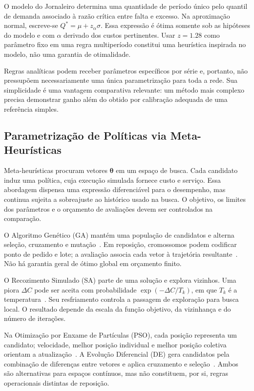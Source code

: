 O modelo do Jornaleiro determina uma quantidade de período único pelo quantil de demanda associado à razão crítica entre falta e excesso. Na aproximação normal, escreve-se $Q^*=\mu+z_\alpha\sigma$. Essa expressão é ótima somente sob as hipóteses do modelo e com $\alpha$ derivado dos custos pertinentes. Usar $z=1.28$ como parâmetro fixo em uma regra multiperíodo constitui uma heurística inspirada no modelo, não uma garantia de otimalidade.

Regras analíticas podem receber parâmetros específicos por série e, portanto, não pressupõem necessariamente uma única parametrização para toda a rede. Sua simplicidade é uma vantagem comparativa relevante: um método mais complexo precisa demonstrar ganho além do obtido por calibração adequada de uma referência simples.

\subsection{Parametrização de Políticas via Meta-Heurísticas}

Meta-heurísticas procuram vetores $\boldsymbol\theta$ em um espaço de busca. Cada candidato induz uma política, cuja execução simulada fornece custo e serviço. Essa abordagem dispensa uma expressão diferenciável para o desempenho, mas continua sujeita a sobreajuste ao histórico usado na busca. O objetivo, os limites dos parâmetros e o orçamento de avaliações devem ser controlados na comparação.

O Algoritmo Genético (GA) mantém uma população de candidatos e alterna seleção, cruzamento e mutação~\citep{Holland1992ANAS,Talbi2009Metaheuristics}. Em reposição, cromossomos podem codificar ponto de pedido e lote; a avaliação associa cada vetor à trajetória resultante~\citep{Yuna2023IntermittentMetaheuristics}. Não há garantia geral de ótimo global em orçamento finito.

O Recozimento Simulado (SA) parte de uma solução e explora vizinhos. Uma piora $\Delta C$ pode ser aceita com probabilidade $\exp(-\Delta C/T_k)$, em que $T_k$ é a temperatura~\citep{Kirkpatrick1983SA}. Seu resfriamento controla a passagem de exploração para busca local. O resultado depende da escala da função objetivo, da vizinhança e do número de iterações.

Na Otimização por Enxame de Partículas (PSO), cada posição representa um candidato; velocidade, melhor posição individual e melhor posição coletiva orientam a atualização~\citep{Kennedy1995PSO}. A Evolução Diferencial (DE) gera candidatos pela combinação de diferenças entre vetores e aplica cruzamento e seleção~\citep{Storn1997DE}. Ambos são alternativas para espaços contínuos, mas não constituem, por si, regras operacionais distintas de reposição.

